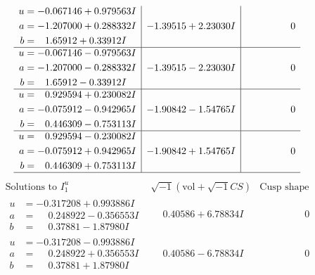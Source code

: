 \documentclass[1p]{elsarticle_modified}
\theoremstyle{definition}
\newcommand{\I}{\sqrt{-1}}
\begin{document}
$$\begin{array}{c|c|c}
\begin{aligned}
u &= -0.067146 + 0.979563 I \\
a &= -1.207000 + 0.288332 I \\
b &= \phantom{-}1.65912 + 0.33912 I\end{aligned}
 & -1.39515 + 2.23030 I & \phantom{-0.000000 } 0 \\ \hline\begin{aligned}
u &= -0.067146 - 0.979563 I \\
a &= -1.207000 - 0.288332 I \\
b &= \phantom{-}1.65912 - 0.33912 I\end{aligned}
 & -1.39515 - 2.23030 I & \phantom{-0.000000 } 0 \\ \hline\begin{aligned}
u &= \phantom{-}0.929594 + 0.230082 I \\
a &= -0.075912 - 0.942965 I \\
b &= \phantom{-}0.446309 - 0.753113 I\end{aligned}
 & -1.90842 - 1.54765 I & \phantom{-0.000000 } 0 \\ \hline\begin{aligned}
u &= \phantom{-}0.929594 - 0.230082 I \\
a &= -0.075912 + 0.942965 I \\
b &= \phantom{-}0.446309 + 0.753113 I\end{aligned}
 & -1.90842 + 1.54765 I & \phantom{-0.000000 } 0\\
 \hline 
 \end{array}$$\newpage$$\begin{array}{c|c|c}  
\text{Solutions to }I^u_{1}& \I (\text{vol} + \sqrt{-1}CS) & \text{Cusp shape}\\
 \hline 
\begin{aligned}
u &= -0.317208 + 0.993886 I \\
a &= \phantom{-}0.248922 - 0.356553 I \\
b &= \phantom{-}0.37881 - 1.87980 I\end{aligned}
 & \phantom{-}0.40586 + 6.78834 I & \phantom{-0.000000 } 0 \\ \hline\begin{aligned}
u &= -0.317208 - 0.993886 I \\
a &= \phantom{-}0.248922 + 0.356553 I \\
b &= \phantom{-}0.37881 + 1.87980 I\end{aligned}
 & \phantom{-}0.40586 - 6.78834 I & \phantom{-0.000000 } 0 \\ \hline\begin{aligned}

\end{aligned}
\end{array}$$
\end{document}
